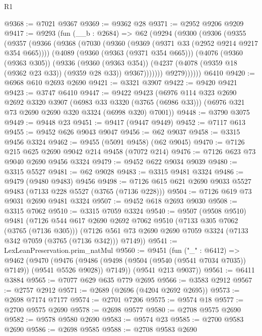 \begin{lexlean}{R1}
\begin{coremodule}
@9368 := @7021 @9367
@9369 := @9362 @28
@9371 := @2952 @9206 @9209
@9417 := @9293
    (fun (__b : @2684) =>
    @62
      (@9294
        (@9300
          (@9306
            (@9355
              (@9357
                (@9366
                  (@9368
                    (@7030
                      (@9360 (@9369 (@9371 @33 (@2952 @9214 @9217 @354 @665))))
                      (@4089
                        (@9360 (@9363 (@9371 @354 @665)))
                        (@4076
                          (@9360 (@9363 @305))
                          (@9336
                            (@9360 (@9363 @354))
                            (@4237 (@4078 (@9359 @18 (@9362 @23 @33)) (@9359 @28 @33)) @9367)))))))
                @9279))))))
    @6410
@9420 := @6968 @610 @2693 @2690
@9421 := @3321 @3907
@9422 := @9420 @9421
@9423 := @3747 @6410
@9447 := @9422
    @9423
    (@6976
      @114
      @323
      @2690
      @2692
      @3320
      @3907
      (@6983 @33 @3320 (@3765 (@6986 @33)))
      (@6976 @321 @73 @2690 @2690 @320 @3324 (@6998 @320) @7001))
@9448 := @3790 @3075
@9449 := @9448 @23
@9451 := @9417 (@9447 @9449)
@9452 := @7117 @613
@9455 := @9452 @626 @9043 @9047
@9456 := @62 @9037
@9458 := @3315 @9456 @3324
@9462 := @9455 (@5091 @9458) (@62 @9045)
@9470 := @7126 @215 @625 @2690 @9042 @214 @9458 (@7072 @214)
@9476 := @7126 @623 @73 @9040 @2690 @9456 @3324
@9479 := @9452 @622 @9034 @9039
@9480 := @3315 @5527
@9481 := @62 @9028
@9483 := @3315 @9481 @3324
@9486 := @9479 (@9480 @9483) @9456
@9498 := @7126 @615 @621 @2690 @9033 @5527 @9483 (@7133 @228 @5527 (@3765 (@7136 @228)))
@9504 := @7126 @619 @73 @9031 @2690 @9481 @3324
@9507 := @9452 @618 @2693 @9030
@9508 := @3315 @7062
@9510 := @3315 @7059 @3324
@9540 := @9507
    (@9508 @9510)
    @9481
    (@7126
      @544
      @617
      @2690
      @2692
      @7062
      @9510
      (@7133 @305 @7062 (@3765 (@7136 @305)))
      (@7126 @561 @73 @2690 @2690 @7059 @3324 (@7133 @342 @7059 (@3765 (@7136 @342))) @7149))
@9541 := LexLeanPreservation.prim_natMul
@9560 := @9451
    (fun ("_" : @6412) =>
    @9462
      (@9470
        (@9476 (@9486 (@9498 (@9504 (@9540 (@9541 @7034 @7035)) @7149)) (@9541 @5526 @9028)) @7149))
      (@9541 @213 @9037))
@9561 := @6411 @3884
@9565 := @7077 @629 @635 @779 @2695
@9566 := @3583 @2912
@9567 := @2757 @2912
@9571 := @2689 (@2696 (@4204 @2692 @2695))
@9573 := @2698 @7174 @7177
@9574 := @2701 @7206
@9575 := @9574 @18
@9577 := @2700 @9575 @2690
@9578 := @2698 @9577
@9580 := @2708 @9575 @2690
@9582 := @9578 @9580 @2690
@9583 := @9574 @23
@9585 := @2700 @9583 @2690
@9586 := @2698 @9585
@9588 := @2708 @9583 @2690

\end{coremodule}
\end{lexlean}
